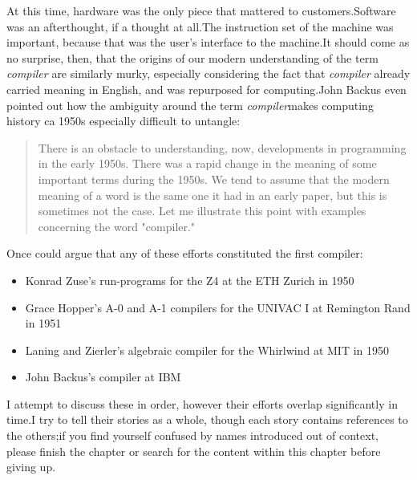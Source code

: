 At this time, hardware was the only piece that mattered to customers.Software
was an afterthought, if a thought at all.The instruction set of the machine was
important, because that was the user's interface to the machine.It should come
as no surprise, then, that the origins of our modern understanding of the term
\textit{compiler} are similarly murky, especially considering the fact that
\textit{compiler} already carried meaning in English, and was repurposed for
computing.John Backus even pointed out how the ambiguity around the term
\textit{compiler}makes computing history ca 1950s especially difficult to
untangle:
\begin{quotation}
  There is an obstacle to understanding, now, developments in
  programming in the early 1950s. There was a rapid change in the
  meaning of some important terms during the 1950s. We tend to assume
  that the modern meaning of a word is the same one it had in an early
  paper, but this is sometimes not the case. Let me illustrate this
  point with examples concerning the word "compiler."
  \cite{Backus_1980_Programming_in_America_in_1950s}
\end{quotation}
\bigskip
Once could argue that any of these efforts constituted the first compiler:
\begin{itemize}
  \item Konrad Zuse's run-programs for the Z4 at the ETH Zurich in 1950
  \item Grace Hopper's A-0 and A-1 compilers for the UNIVAC I at
    Remington Rand in 1951
  \item Laning and Zierler's algebraic compiler for the Whirlwind at MIT in 1950
  \item John Backus's \FTNI{} compiler at IBM
\end{itemize}

I attempt to discuss these in order, however their efforts overlap
significantly in time.I try to tell their stories as a whole, though each story
contains references to the others;if you find yourself confused by names
introduced out of context, please finish the chapter or search for the content
within this chapter before giving up.

